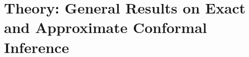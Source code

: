 \documentclass[final,12pt]{colt2018} %
\newcommand{\KW}[1]{\textcolor{cyan}{KW: #1}}
\begin{document}
\section{Theory: General Results on Exact and Approximate Conformal Inference}
\label{sec: theory}







\end{document}
